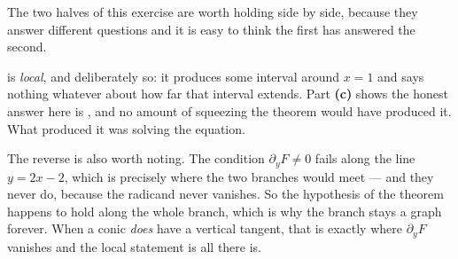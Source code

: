 \begin{exercisesolution}
\begin{remark}
\label{rem:implicit_local_versus_global}
The two halves of this exercise are worth holding side by side, because they answer different
questions and it is easy to think the first has answered the second.

 is \emph{local}, and deliberately so: it produces some
interval around $x=1$ and says nothing whatever about how far that interval extends. Part
\textbf{(c)} shows the honest answer here is , and no amount of squeezing
the theorem would have produced it. What produced it was solving the equation.

The reverse is also worth noting. The condition $\partial_yF \neq 0$ fails along the line
$y = 2x-2$, which is precisely where the two branches would meet --- and they never do, because
the radicand never vanishes. So the hypothesis of the theorem happens to hold along the whole
branch, which is why the branch stays a graph forever. When a conic \emph{does} have a vertical
tangent, that is exactly where $\partial_yF$ vanishes and the local statement is all there is.
\end{remark}
\end{exercisesolution}



